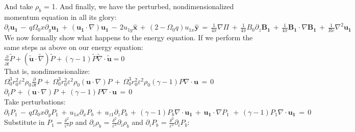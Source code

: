 \documentclass[letterpaper,12pt]{article}
\newcommand\reye{\mathrel{Re}}
\begin{document}
And take $\rho_b$ = 1. And finally, we have the perturbed, nondimensionalized momentum equation in all its glory: \\

$\partial_t \mathbf{u_1} \, - \, q\Omega_0 x \partial_y \mathbf{u_1} \, + \, \left(\mathbf{u_1}\cdot \nabla\right) \mathbf{u_1} \, - \, 2 u_{1y} \mathbf{\hat{x}} \, + \, \left(2 - \Omega_0 q\right)u_{1x}\mathbf{\hat{y}} \, = \, \frac{1}{4\pi} \nabla \Pi \, + \, \frac{1}{4\pi}B_0\partial_z\mathbf{B_1} \, + \, \frac{1}{4\pi}\mathbf{B_1} \cdot \nabla \mathbf{B_1} \,+ \, \frac{1}{\reye}\nabla^2 \mathbf{u_1}$ \\

We now formally show what happens to the energy equation. If we perform the same steps as above on our energy equation: \\

$\frac{\partial}{\partial\widetilde{t}} \widetilde{P} + \left(\widetilde{\mathbf{u}} \cdot \widetilde{\nabla} \right)\widetilde{P} + \left(\gamma -1\right)\widetilde{P} \widetilde{\nabla} \cdot \widetilde{\mathbf{u}} = 0$ \\

That is, nondimensionalize: \\

$\Omega_0^3 r_0^2 \varepsilon^2 \rho_0 \frac{\partial}{\partial t} P \, + \, \Omega_0^3 r_0^2 \varepsilon^2 \rho_0 \left(\mathbf{u} \cdot \nabla \right) P \, + \, \Omega_0^3 r_0^2 \varepsilon^2 \rho_0 \left(\gamma - 1 \right) P \nabla \cdot \mathbf{u} \, = \, 0 $ \\

$\partial_t P \, + \, \left(\mathbf{u} \cdot \nabla \right) P \, + \, \left(\gamma - 1 \right) P \nabla \cdot \mathbf{u} \, = \, 0 $ \\

Take perturbations: \\

$\partial_t P_1 \, - \, q\Omega_0 x \partial_y P_1 \, + \, u_{1x}\partial_x P_b \, + \, u_{z1}\partial_z P_b \, + \, \left(\gamma - 1 \right) P_b \nabla \cdot \mathbf{u_1} \, + \, \mathbf{u_1} \cdot \nabla P_1 \, \, + \, \left(\gamma - 1\right)P_1 \nabla \cdot \mathbf{u_1} \, = \, 0$ \\

Substitute in $P_1 = \frac{\delta^2}{\varepsilon^2} p$ and $\partial_i \rho_b$ = $\frac{\delta^2}{\varepsilon^2} \partial_i \rho_b$ and $\partial_i P_b$ = $\frac{\delta^2}{\varepsilon^2} \partial_i P_b$: \\
\end{document}
